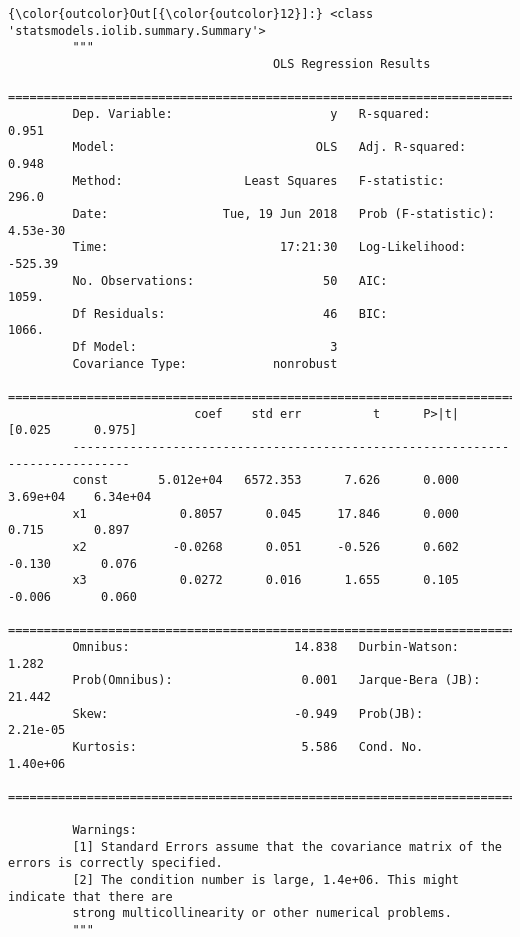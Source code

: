 \documentclass[11pt]{article}
\begin{document}
\begin{Verbatim}[commandchars=\\\{\}]
{\color{outcolor}Out[{\color{outcolor}12}]:} <class 'statsmodels.iolib.summary.Summary'>
         """
                                     OLS Regression Results                            
         ==============================================================================
         Dep. Variable:                      y   R-squared:                       0.951
         Model:                            OLS   Adj. R-squared:                  0.948
         Method:                 Least Squares   F-statistic:                     296.0
         Date:                Tue, 19 Jun 2018   Prob (F-statistic):           4.53e-30
         Time:                        17:21:30   Log-Likelihood:                -525.39
         No. Observations:                  50   AIC:                             1059.
         Df Residuals:                      46   BIC:                             1066.
         Df Model:                           3                                         
         Covariance Type:            nonrobust                                         
         ==============================================================================
                          coef    std err          t      P>|t|      [0.025      0.975]
         ------------------------------------------------------------------------------
         const       5.012e+04   6572.353      7.626      0.000    3.69e+04    6.34e+04
         x1             0.8057      0.045     17.846      0.000       0.715       0.897
         x2            -0.0268      0.051     -0.526      0.602      -0.130       0.076
         x3             0.0272      0.016      1.655      0.105      -0.006       0.060
         ==============================================================================
         Omnibus:                       14.838   Durbin-Watson:                   1.282
         Prob(Omnibus):                  0.001   Jarque-Bera (JB):               21.442
         Skew:                          -0.949   Prob(JB):                     2.21e-05
         Kurtosis:                       5.586   Cond. No.                     1.40e+06
         ==============================================================================
         
         Warnings:
         [1] Standard Errors assume that the covariance matrix of the errors is correctly specified.
         [2] The condition number is large, 1.4e+06. This might indicate that there are
         strong multicollinearity or other numerical problems.
         """
\end{Verbatim}
            
\end{document}
